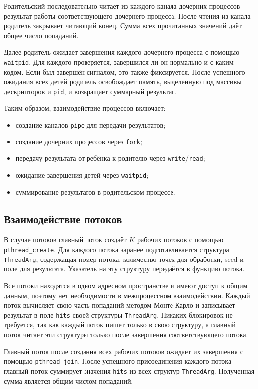 Родительский последовательно читает из каждого канала дочерних процессов результат работы соответствующего
дочернего процесса. После чтения из канала родитель закрывает читающий конец. Сумма
всех прочитанных значений даёт общее число попаданий.

Далее родитель ожидает завершения каждого дочернего процесса с помощью
\texttt{waitpid}. Для каждого проверяется, завершился ли он нормально и с
каким кодом. Если был завершён сигналом, это также фиксируется. После
успешного ожидания всех детей родитель освобождает память, выделенную под массивы
дескрипторов и \texttt{pid}, и возвращает суммарный результат.

Таким образом, взаимодействие процессов включает:
\begin{itemize}
    \item создание каналов \texttt{pipe} для передачи результатов;
    \item создание дочерних процессов через \texttt{fork};
    \item передачу результата от ребёнка к родителю через \texttt{write}/\texttt{read};
    \item ожидание завершения детей через \texttt{waitpid};
    \item суммирование результатов в родительском процессе.
\end{itemize}

\subsection*{Взаимодействие потоков}

В случае потоков главный поток создаёт \(K\) рабочих потоков с помощью
\texttt{pthread\_create}. Для каждого потока заранее подготавливается структура
\texttt{ThreadArg}, содержащая номер потока, количество точек для обработки, seed и
поле для результата. Указатель на эту структуру передаётся в функцию потока.

Все потоки находятся в одном адресном пространстве и имеют доступ к общим данным,
поэтому нет необходимости в межпроцессном взаимодействии. Каждый поток вычисляет
свою часть попаданий методом Монте-Карло и записывает результат в поле
\texttt{hits} своей структуры \texttt{ThreadArg}. Никаких блокировок не требуется,
так как каждый поток пишет только в свою структуру, а главный поток читает эти
структуры только после завершения соответствующего потока.

Главный поток после создания всех рабочих потоков ожидает их завершения с помощью
\texttt{pthread\_join}. После успешного присоединения каждого потока главный поток
суммирует значения \texttt{hits} из всех структур \texttt{ThreadArg}. Полученная
сумма является общим числом попаданий.


